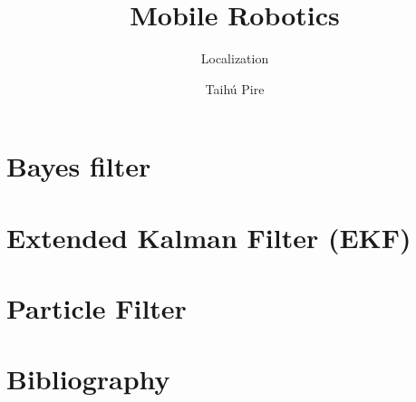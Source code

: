 \documentclass[aspectratio=169,compress]{beamer}
\subtitle{Localization}
\title{Mobile Robotics}
\author{Taihú Pire}
\institute{Robotics Laboratory}
\date{}
\begin{document}
 \frame{\titlepage}

 \section{Bayes filter}
 

 \section{Extended Kalman Filter (EKF)}
 

 \section{Particle Filter}
 

 \section{Bibliography}
 

\end{document}
